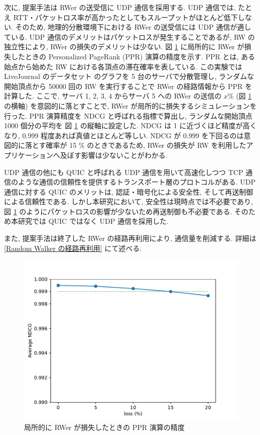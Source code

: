 次に, 提案手法は RWer の送受信に UDP 通信を採用する. UDP 通信では, たとえ RTT・パケットロス率が高かったとしてもスループットがほとんど低下しない. そのため, 地理的分散環境下における RWer の送受信には UDP 通信が適している. UDP 通信のデメリットはパケットロスが発生することであるが, RW の独立性により, RWer の損失のデメリットは少ない. 図 \ref{局所的に RWer が損失したときの PPR 演算の精度} に局所的に RWer が損失したときの Personalized PageRank (PPR) 演算の精度を示す. PPR とは, ある始点から始めた RW における各頂点の滞在確率を表している. この実験では LiveJournal のデータセット\cite{snapnets} のグラフを 5 台のサーバで分散管理し, ランダムな開始頂点から 50000 回の RW を実行することで RWer の経路情報から PPR を計算した. ここで, サーバ 1, 2, 3, 4 からサーバ 5 への RWer の送信の $x\%$ (図 \ref{局所的に RWer が損失したときの PPR 演算の精度} の横軸) を意図的に落とすことで, RWer が局所的に損失するシミュレーションを行った. PPR 演算精度を NDCG と呼ばれる指標で算出し, ランダムな開始頂点 1000 個分の平均を 図 \ref{局所的に RWer が損失したときの PPR 演算の精度} の縦軸に設定した. NDCG は 1 に近づくほど精度が高くなり, 0.999 程度あれば真値とほとんど等しい. NDCG が 0.999 を下回るのは意図的に落とす確率が 15 $\%$ のときであるため, RWer の損失が RW を利用したアプリケーションへ及ぼす影響は少ないことがわかる. 

UDP 通信の他にも QUIC と呼ばれる UDP 通信を用いて高速化しつつ TCP 通信のような通信の信頼性を提供するトランスポート層のプロトコルがある. UDP 通信に対する QUIC のメリットは, 認証・暗号化による安全性, そして再送制御による信頼性である. しかし本研究において, 安全性は現時点では不必要であり, 図 \ref{局所的に RWer が損失したときの PPR 演算の精度} のようにパケットロスの影響が少ないため再送制御も不必要である. そのため本研究では QUIC ではなく UDP 通信を採用した. 

また, 提案手法は終了した RWer の経路再利用により, 通信量を削減する. 詳細は \ref{Random Walker の経路再利用} にて述べる. 

\begin{figure}[t]
    \centering
    \includegraphics[scale=0.7]{figure/eva_drop.pdf}
    \caption{局所的に RWer が損失したときの PPR 演算の精度}
    \label{局所的に RWer が損失したときの PPR 演算の精度}
\end{figure}

